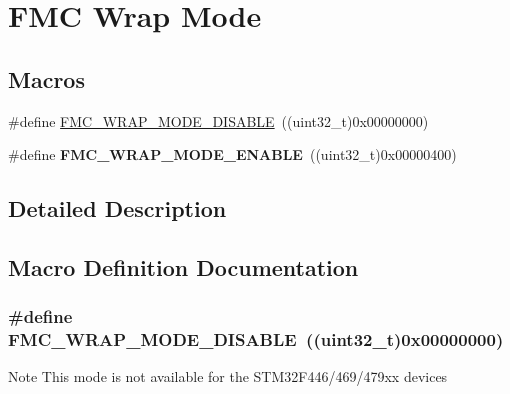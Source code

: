 \hypertarget{group___f_m_c___wrap___mode}{}\section{F\+MC Wrap Mode}
\label{group___f_m_c___wrap___mode}
\subsection*{Macros}
\begin{DoxyCompactItemize}
\item 
\#define \hyperlink{group___f_m_c___wrap___mode_gac0e09a10825443bf06326d107f8da580}{F\+M\+C\+\_\+\+W\+R\+A\+P\+\_\+\+M\+O\+D\+E\+\_\+\+D\+I\+S\+A\+B\+LE}~((uint32\+\_\+t)0x00000000)
\item 
\#define {\bfseries F\+M\+C\+\_\+\+W\+R\+A\+P\+\_\+\+M\+O\+D\+E\+\_\+\+E\+N\+A\+B\+LE}~((uint32\+\_\+t)0x00000400)\hypertarget{group___f_m_c___wrap___mode_gafccec744877929c1ebeb42b34fef141b}{}\label{group___f_m_c___wrap___mode_gafccec744877929c1ebeb42b34fef141b}

\end{DoxyCompactItemize}


\subsection{Detailed Description}


\subsection{Macro Definition Documentation}
\subsubsection[{\texorpdfstring{F\+M\+C\+\_\+\+W\+R\+A\+P\+\_\+\+M\+O\+D\+E\+\_\+\+D\+I\+S\+A\+B\+LE}{FMC_WRAP_MODE_DISABLE}}]{\setlength{\rightskip}{0pt plus 5cm}\#define F\+M\+C\+\_\+\+W\+R\+A\+P\+\_\+\+M\+O\+D\+E\+\_\+\+D\+I\+S\+A\+B\+LE~((uint32\+\_\+t)0x00000000)}\hypertarget{group___f_m_c___wrap___mode_gac0e09a10825443bf06326d107f8da580}{}\label{group___f_m_c___wrap___mode_gac0e09a10825443bf06326d107f8da580}
\begin{DoxyNote}{Note}
This mode is not available for the S\+T\+M32\+F446/469/479xx devices 
\end{DoxyNote}
